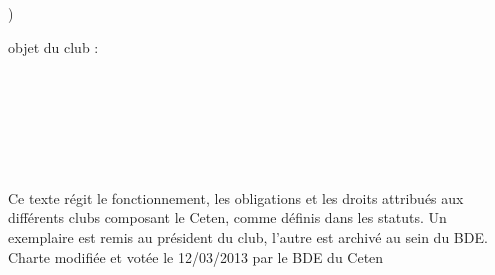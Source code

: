 \documentclass{article} %
\begin{document}
\begin{titlepage}
\begin{todolist}
			\underline{\hspace{5cm}})
		\end{todolist}
		\vspace{\baselineskip}
		objet du club :\\
		\hspace{\textwidth}\\
		\underline{\hspace{\textwidth}}\\
		\hspace{\textwidth}\\
		\underline{\hspace{\textwidth}}\\
		\hspace{\textwidth}\\
		\underline{\hspace{\textwidth}}\\

		\vfill
		\begin{center}
			{\footnotesize \light Ce texte régit le fonctionnement, les obligations et les
			droits attribués aux différents clubs composant le Ceten, comme
			définis dans les statuts. Un exemplaire est remis au président du
			club, l’autre est archivé au sein du BDE\@. \\
			Charte modifiée et votée le 12/03/2013 par le BDE du Ceten}
		\end{center}
	\end{titlepage}


\end{document}

